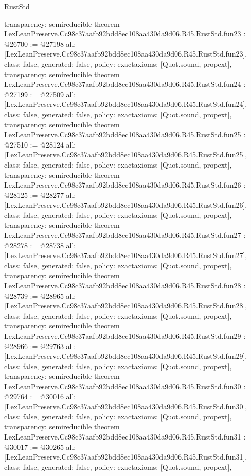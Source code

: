 \begin{lexlean}{RustStd}
\begin{coremodule}
{  transparency: semireducible
}
theorem LexLeanPreserve.Cc98c37aafb92bdd8ec108aa430da9d06.R45.RustStd.fun23 : @26700 := @27198 {
  all: [LexLeanPreserve.Cc98c37aafb92bdd8ec108aa430da9d06.R45.RustStd.fun23],
  class: false,
  generated: false,
  policy: exact{axioms: [Quot.sound, propext]},
  transparency: semireducible
}
theorem LexLeanPreserve.Cc98c37aafb92bdd8ec108aa430da9d06.R45.RustStd.fun24 : @27199 := @27509 {
  all: [LexLeanPreserve.Cc98c37aafb92bdd8ec108aa430da9d06.R45.RustStd.fun24],
  class: false,
  generated: false,
  policy: exact{axioms: [Quot.sound, propext]},
  transparency: semireducible
}
theorem LexLeanPreserve.Cc98c37aafb92bdd8ec108aa430da9d06.R45.RustStd.fun25 : @27510 := @28124 {
  all: [LexLeanPreserve.Cc98c37aafb92bdd8ec108aa430da9d06.R45.RustStd.fun25],
  class: false,
  generated: false,
  policy: exact{axioms: [Quot.sound, propext]},
  transparency: semireducible
}
theorem LexLeanPreserve.Cc98c37aafb92bdd8ec108aa430da9d06.R45.RustStd.fun26 : @28125 := @28277 {
  all: [LexLeanPreserve.Cc98c37aafb92bdd8ec108aa430da9d06.R45.RustStd.fun26],
  class: false,
  generated: false,
  policy: exact{axioms: [Quot.sound, propext]},
  transparency: semireducible
}
theorem LexLeanPreserve.Cc98c37aafb92bdd8ec108aa430da9d06.R45.RustStd.fun27 : @28278 := @28738 {
  all: [LexLeanPreserve.Cc98c37aafb92bdd8ec108aa430da9d06.R45.RustStd.fun27],
  class: false,
  generated: false,
  policy: exact{axioms: [Quot.sound, propext]},
  transparency: semireducible
}
theorem LexLeanPreserve.Cc98c37aafb92bdd8ec108aa430da9d06.R45.RustStd.fun28 : @28739 := @28965 {
  all: [LexLeanPreserve.Cc98c37aafb92bdd8ec108aa430da9d06.R45.RustStd.fun28],
  class: false,
  generated: false,
  policy: exact{axioms: [Quot.sound, propext]},
  transparency: semireducible
}
theorem LexLeanPreserve.Cc98c37aafb92bdd8ec108aa430da9d06.R45.RustStd.fun29 : @28966 := @29763 {
  all: [LexLeanPreserve.Cc98c37aafb92bdd8ec108aa430da9d06.R45.RustStd.fun29],
  class: false,
  generated: false,
  policy: exact{axioms: [Quot.sound, propext]},
  transparency: semireducible
}
theorem LexLeanPreserve.Cc98c37aafb92bdd8ec108aa430da9d06.R45.RustStd.fun30 : @29764 := @30016 {
  all: [LexLeanPreserve.Cc98c37aafb92bdd8ec108aa430da9d06.R45.RustStd.fun30],
  class: false,
  generated: false,
  policy: exact{axioms: [Quot.sound, propext]},
  transparency: semireducible
}
theorem LexLeanPreserve.Cc98c37aafb92bdd8ec108aa430da9d06.R45.RustStd.fun31 : @30017 := @30265 {
  all: [LexLeanPreserve.Cc98c37aafb92bdd8ec108aa430da9d06.R45.RustStd.fun31],
  class: false,
  generated: false,
  policy: exact{axioms: [Quot.sound, propext]},
}
\end{coremodule}
\end{lexlean}
